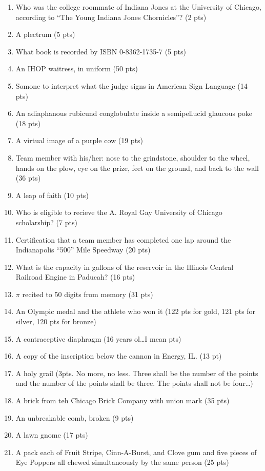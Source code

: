 \begin{enumerate}
\item Who was the college roommate of Indiana Jones at the University of Chicago, according to ``The Young Indiana Jones Chornicles''? (2 pts)
\item A plectrum (5 pts)
\item What book is recorded by ISBN 0-8362-1735-7 (5 pts)
\item An IHOP waitress, in uniform (50 pts)
\item Somone to interpret what the judge signs in American Sign Language (14 pts)
\item An adiaphanous rubicund conglobulate inside a semipellucid glaucous poke (18 pts)
\item A virtual image of a purple cow (19 pts)
\item Team member with his/her: nose to the grindstone, shoulder to the wheel, hands on the plow, eye on the prize, feet on the ground, and back to the wall (36 pts)
\item A leap of faith (10 pts)
\item Who is eligible to recieve the A. Royal Gay University of Chicago scholarship? (7 pts)
\item Certification that a team member has completed one lap around the Indianapolis ``500'' Mile Speedway (20 pts)
\item What is the capacity in gallons of the reservoir in the Illinois Central Railroad Engine in Paducah? (16 pts)
\item $\pi$ recited to 50 digits from memory (31 pts)
\item An Olympic medal and the athlete who won it (122 pts for gold, 121 pts for silver, 120 pts for bronze)
\item A contraceptive diaphragm (16 years ol{\dots}I mean pts)
\item A copy of the inscription below the cannon in Energy, IL. (13 pt)
\item A holy grail (3pts. No more, no less. Three shall be the number of the points and the number of the points shall be three. The points shall not be four{\dots})
\item A brick from teh Chicago Brick Company with union mark (35 pts)
\item An unbreakable comb, broken (9 pts)
\item A lawn gnome (17 pts)
\item A pack each of Fruit Stripe{\texttrademark}, Cinn-A-Burst{\texttrademark}, and Clove{\texttrademark} gum and five pieces of Eye Poppers{\texttrademark} all chewed simultaneously by the same person (25 pts)

\end{enumerate}
